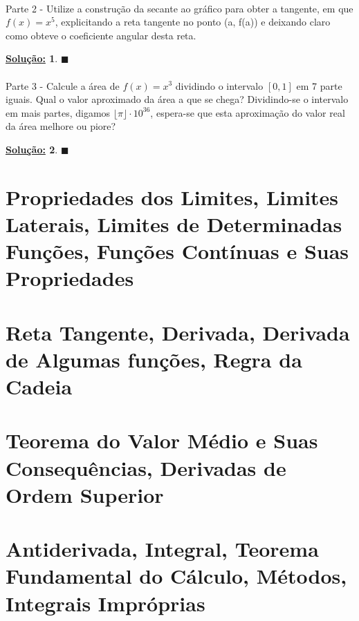 \documentclass{article}
\newtheorem*{sol*}{\underline{Solu\c c\~ao:}}
\renewcommand\qedsymbol{$\blacksquare$}
\begin{document}
\paragraph{} Parte 2 - Utilize a constru\c c\~ao da secante ao gr\'afico para obter a tangente, em que $f(x) = x^5$, explicitando a reta tangente no ponto (a, f(a)) e deixando claro como obteve o coeficiente angular desta reta.
\begin{sol*}

\qedsymbol
\end{sol*}
\paragraph{} Parte 3 - Calcule a \'area de $f(x) = x^3$ dividindo o intervalo $[0, 1]$ em 7 parte iguais. Qual o valor aproximado da \'area a que se chega? Dividindo-se o intervalo em mais partes, digamos $\lfloor{\pi}\rfloor\cdot{10^{36}}$, espera-se que esta aproxima\c c\~ao do valor real da \'area melhore ou piore?
\begin{sol*}

\qedsymbol
\end{sol*}

\newpage

\section{Propriedades dos Limites, Limites Laterais, Limites de Determinadas Fun\c c\~oes, Fun\c c\~oes Cont\'inuas e Suas Propriedades}

\newpage

\section{Reta Tangente, Derivada, Derivada de Algumas fun\c c\~oes, Regra da Cadeia}

\newpage

\section{Teorema do Valor M\'edio e Suas Consequ\^encias, Derivadas de Ordem Superior}

\newpage

\section{Antiderivada, Integral, Teorema Fundamental do C\'alculo, M\'etodos, Integrais Impr\'oprias}
\end{document}
